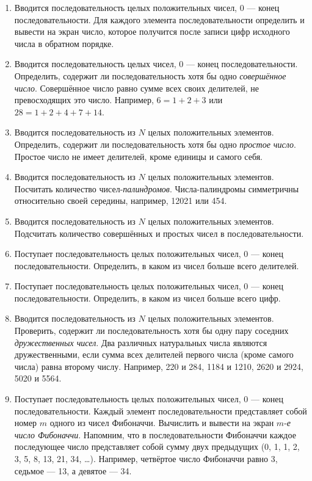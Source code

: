 \begin{enumerate}
\item Вводится последовательность целых положительных чисел, 0 --- конец последовательности. Для каждого элемента
последовательности определить и вывести на экран число, которое получится после записи цифр исходного числа в обратном
порядке.
\item Вводится последовательность целых чисел, 0 --- конец последовательности. Определить, содержит ли последовательность
хотя бы одно\emph{ совершённое число}. Совершённое число равно сумме всех своих делителей, не
превосходящих это число. Например, $6=1+2+3$ или $28=1+2+4+7+14$.
\item Вводится последовательность из $N$ целых положительных элементов. Определить, содержит ли последовательность хотя бы
одно \emph{простое число}. Простое число не имеет делителей, кроме единицы и самого себя.
\item Вводится последовательность из $N$ целых положительных элементов. Посчитать количество чисел-\emph{палиндромов}. 
Числа-палиндромы симметричны относительно своей середины, например, 12021 или 454.
\item Вводится последовательность из $N$ целых положительных элементов. Подсчитать количество совершённых и простых чисел
в последовательности.
\item Поступает последовательность целых положительных чисел, 0 --- конец последовательности. Определить, в каком из чисел
больше всего делителей.
\item Поступает последовательность целых положительных чисел, 0 --- конец последовательности. Определить, в каком из чисел
больше всего цифр. 
\item Вводится последовательность из $N$ целых положительных элементов. Проверить, содержит ли последовательность хотя бы
одну пару соседних \emph{дружественных чисел}. Два различных натуральных числа являются дружественными,
если сумма всех делителей первого числа (кроме самого числа) равна второму числу. Например, 220 и 284, 1184 и 1210,
2620 и 2924, 5020 и 5564.
\item Поступает последовательность целых положительных чисел, 0 --- конец последовательности. 
Каждый элемент последовательности представляет собой номер $m$ одного из чисел Фибоначчи. 
Вычислить и вывести на экран \mbox{$m$-\emph{е}} \emph{число Фибоначчи}. Напомним, что в последовательности Фибоначчи 
каждое последующее число представляет собой сумму двух предыдущих (0, 1, 1, 2, 3, 5, 8, 13, 21, 34, \dots). 
Например, четвёртое число Фибоначчи равно 3, седьмое --- 13, а девятое --- 34.

\end{enumerate}
